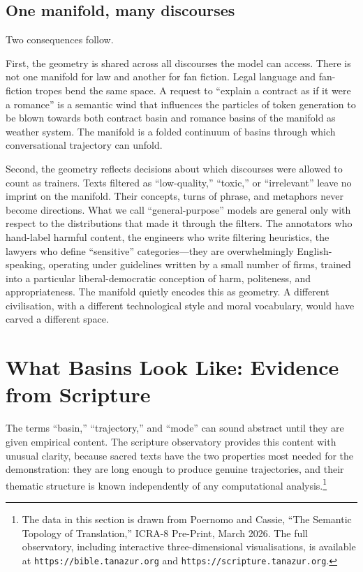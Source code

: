 \subsection{One manifold, many discourses}

Two consequences follow.

First, the geometry is shared across all discourses the model can access. There is not one manifold for law and another for fan fiction. Legal language and fan-fiction tropes bend the same space. A request to ``explain a contract as if it were a romance'' is a semantic wind that influences the particles of token generation to be blown towards both contract basin and romance basins of the manifold as weather system. The manifold is a folded continuum of basins through which conversational trajectory can unfold.

Second, the geometry reflects decisions about which discourses were allowed to count as trainers. Texts filtered as ``low-quality,'' ``toxic,'' or ``irrelevant'' leave no imprint on the manifold. Their concepts, turns of phrase, and metaphors never become directions. What we call ``general-purpose'' models are general only with respect to the distributions that made it through the filters. The annotators who hand-label harmful content, the engineers who write filtering heuristics, the lawyers who define ``sensitive'' categories---they are overwhelmingly English-speaking, operating under guidelines written by a small number of firms, trained into a particular liberal-democratic conception of harm, politeness, and appropriateness. The manifold quietly encodes this as geometry. A different civilisation, with a different technological style and moral vocabulary, would have carved a different space.


\section{What Basins Look Like: Evidence from Scripture}

The terms ``basin,'' ``trajectory,'' and ``mode'' can sound abstract until they are given empirical content. The scripture observatory provides this content with unusual clarity, because sacred texts have the two properties most needed for the demonstration: they are long enough to produce genuine trajectories, and their thematic structure is known independently of any computational analysis.\footnote{The data in this section is drawn from Poernomo and Cassie, ``The Semantic Topology of Translation,'' ICRA-8 Pre-Print, March 2026. The full observatory, including interactive three-dimensional visualisations, is available at \texttt{https://bible.tanazur.org} and \texttt{https://scripture.tanazur.org}.}

